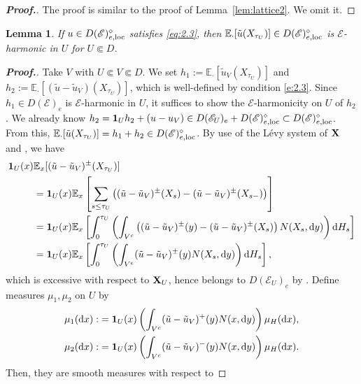 \documentclass[12pt,a4paper]{article}
\newtheorem{lem}[thm]{Lemma}
\renewcommand{\d}{\mathrm{d}}
\newcommand{\loc}{{\rm loc}}
\newcommand{\1}{{\bf 1}}
\begin{document}
\begin{proof}[{\bf Proof.}]
The proof is similar to the proof of Lemma~\ref{lem:lattice2}. We omit it. 
\end{proof}
\begin{lem}\label{lem:Subharmonicity}
If $u\in  D(\mathscr{E})^{\diamond}_{e,\loc}$ satisfies \eqref{eq:2.3}, then 
$\mathbb{E}_{\cdot}[\tilde{u}(X_{\tau_U})]\in D(\mathscr{E})^{\diamond}_{e,\loc}$ is $\mathscr{E}$-harmonic in $U$ for $U\Subset D$. 
\end{lem}
\begin{proof}[{\bf Proof.}]
Take $V$ with $U\Subset V\Subset D$. 
We set $h_1:=\mathbb{E}_{\cdot}[\tilde{u}_V(X_{\tau_U})]$ and $h_2:=\mathbb{E}_{\cdot}[(\tilde{u}-\tilde{u}_V)(X_{\tau_U})]$, which is well-defined by condition \eqref{e:2.3}. Since $h_1\in D(\mathscr{E})_e$ is $\mathscr{E}$-harmonic in $U$, it suffices to show the 
$\mathscr{E}$-harmonicity on $U$ of $h_2$. We already know $h_2
=\1_Uh_2+(u-u_V)\in D(\mathscr{E}_U)_e+D(\mathscr{E})^{\diamond}_{e,\loc}\subset D(\mathscr{E})^{\diamond}_{e,\loc}$. From this,  
$\mathbb{E}_{\cdot}[\tilde{u}(X_{\tau_U})]=h_1+h_2\in D(\mathscr{E})_{e,\loc}^{\diamond}$.  
By use of the L\'evy system of ${\bf X}$ and \cite[(A.3.33)]{CFbook}, we have  
\begin{align}
\1_U(x)&\mathbb{E}_x[(\tilde{u}-\tilde{u}_V)^{\pm}(X_{\tau_U})]\notag\\&=
\1_U(x)\mathbb{E}_x\left[\sum_{s\leq\tau_U}\left((\tilde{u}-\tilde{u}_V)^{\pm}(X_s)-(\tilde{u}-\tilde{u}_V)^{\pm}(X_{s-})\right)\right]\notag
\\&=\1_U(x)\mathbb{E}_x\left[\int_0^{\tau_U}\left(\int_{V^c}\left((\tilde{u}-\tilde{u}_V)^{\pm}(y)-(\tilde{u}-\tilde{u}_V)^{\pm}(X_s)\right)N(X_s,{\d} y)\right){\d} H_s \right]\notag\\
&=\1_U(x)\mathbb{E}_x\left[\int_0^{\tau_U}\left(\int_{V^c}(\tilde{u}-\tilde{u}_V)^{\pm}(y)N(X_s,{\d} y)\right){\d} H_s \right],\label{eq:relation}
\end{align}
which is excessive with respect to ${\bf X}_U$, hence 
belongs to $D(\mathscr{E}_U)_e$ by 
\cite[Lemma~3.3]{CK}.
Define measures $\mu_1,\mu_2$ on $U$ by 
\begin{align*}
\mu_1({\d} x):&=\1_U(x)\left(\int_{V^c}(\tilde{u}-\tilde{u}_V)^+(y)N(x,{\d} y)\right)\mu_H({\d} x),\\ 
\mu_2({\d} x):&=\1_U(x)\left(\int_{V^c}(\tilde{u}-\tilde{u}_V)^-(y)N(x,{\d} y)\right)\mu_H({\d} x).
\end{align*}
Then, they are smooth measures with respect to 

\end{proof}
\end{document}
